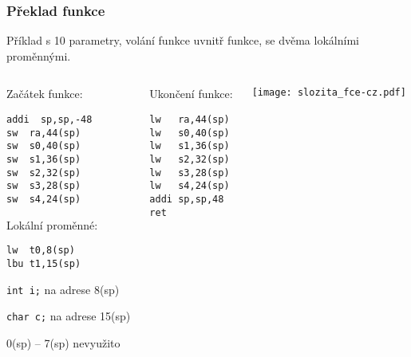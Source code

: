 \documentclass{beamer}
\begin{document}
\begin{frame}[fragile,shrink=5]
\frametitle{Překlad funkce}

Příklad s 10 parametry, volání funkce uvnitř funkce, se dvěma lokálními proměnnými.

\begin{columns}
\begin{column}{0.35\textwidth}
Začátek funkce:

\begin{verbatim}
addi  sp,sp,-48
sw  ra,44(sp)
sw  s0,40(sp)
sw  s1,36(sp)
sw  s2,32(sp)
sw  s3,28(sp)
sw  s4,24(sp)
\end{verbatim}

Lokální proměnné:
\begin{verbatim}
lw  t0,8(sp)
lbu t1,15(sp)
\end{verbatim}

\texttt{int i;} na adrese 8(sp)

\texttt{char c;} na adrese 15(sp)

0(sp) -- 7(sp) nevyužito


\end{column}   
\begin{column}{0.29\textwidth}
Ukončení funkce:

\begin{verbatim}
lw   ra,44(sp)
lw   s0,40(sp)
lw   s1,36(sp)
lw   s2,32(sp)
lw   s3,28(sp)
lw   s4,24(sp)
addi sp,sp,48
ret
\end{verbatim}

\end{column}
\begin{column}{0.35\textwidth}  
\texttt{[image: slozita\_fce-cz.pdf]}
\end{column}
\end{columns}
\end{frame}
\end{document}
